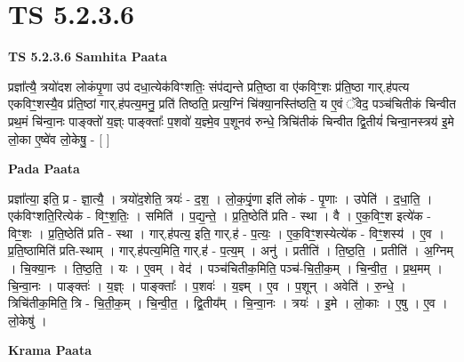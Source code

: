 \documentclass[17pt]{extarticle}
\begin{document}
\section{ TS 5.2.3.6 }

\textbf{TS 5.2.3.6 } \newline
\textbf{Samhita Paata} \newline

प्रज्ञा᳚त्यै॒ त्रयो॑दश लोकंपृ॒णा उप॑ दधा॒त्येक॑विꣳशतिः॒ संप॑द्यन्ते प्रति॒ष्ठा वा ए॑कविꣳ॒॒शः प्र॑ति॒ष्ठा गार्.ह॑पत्य एकविꣳ॒॒शस्यै॒व प्र॑ति॒ष्ठां गार्.ह॑पत्य॒मनु॒ प्रति॑ तिष्ठति॒ प्रत्य॒ग्निं चि॑क्या॒नस्ति॑ष्ठति॒ य ए॒वं ॅवेद॒ पञ्च॑चितीकं चिन्वीत प्रथ॒मं चि॑न्वा॒नः पाङ्क्तो॑ य॒ज्ञ्ः पाङ्क्ताः᳚ प॒शवो॑ य॒ज्ञ्मे॒व प॒शूनव॑ रुन्धे॒ त्रिचि॑तीकं चिन्वीत द्वि॒तीयं॑ चिन्वा॒नस्त्रय॑ इ॒मे लो॒का ए॒ष्वे॑व लो॒केषु॒ - [  ] \newline

\textbf{Pada Paata} \newline

प्रज्ञा᳚त्या॒ इति॒ प्र - ज्ञा॒त्यै॒ । त्रयो॑द॒शेति॒ त्रयः॑ - द॒श॒ । लो॒क॒पृं॒णा इति॑ लोकं - पृ॒णाः । उपेति॑ । द॒धा॒ति॒ । एक॑विꣳशति॒रित्येक॑ - विꣳ॒॒श॒तिः॒ । समिति॑ । प॒द्य॒न्ते॒ । प्र॒ति॒ष्ठेति॑ प्रति - स्था । वै । ए॒क॒विꣳ॒॒श इत्ये॑क - विꣳ॒॒शः । प्र॒ति॒ष्ठेति॑ प्रति - स्था । गार्.ह॑पत्य॒ इति॒ गार्.ह॑ - प॒त्यः॒ । ए॒क॒विꣳ॒॒शस्येत्ये॑क - विꣳ॒॒शस्य॑ । ए॒व । प्र॒ति॒ष्ठामिति॑ प्रति-स्थाम् । गार्.ह॑पत्य॒मिति॒ गार्.ह॑ - प॒त्य॒म् । अनु॑ । प्रतीति॑ । ति॒ष्ठ॒ति॒ । प्रतीति॑ । अ॒ग्निम् । चि॒क्या॒नः । ति॒ष्ठ॒ति॒ । यः । ए॒वम् । वेद॑ । पञ्च॑चितीक॒मिति॒ पञ्च॑-चि॒ती॒क॒म् । चि॒न्वी॒त॒ । प्र॒थ॒मम् । चि॒न्वा॒नः । पाङ्क्तः॑ । य॒ज्ञ्ः । पाङ्क्ताः᳚ । प॒शवः॑ । य॒ज्ञ्म् । ए॒व । प॒शून् । अवेति॑ । रु॒न्धे॒ । त्रिचि॑तीक॒मिति॒ त्रि - चि॒ती॒क॒म् । चि॒न्वी॒त॒ । द्वि॒तीय᳚म् । चि॒न्वा॒नः । त्रयः॑ । इ॒मे । लो॒काः । ए॒षु । ए॒व । लो॒केषु॑ ।  \newline


\textbf{Krama Paata} \newline
\end{document}

